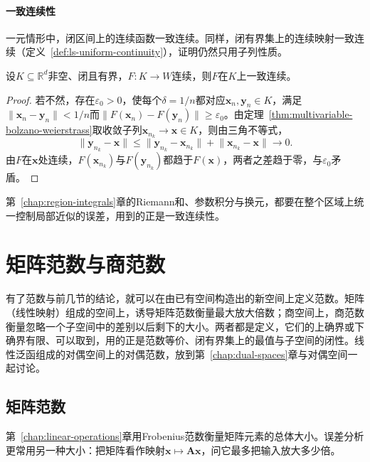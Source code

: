 \paragraph{一致连续性}
一元情形中，闭区间上的连续函数一致连续。同样，闭有界集上的连续映射一致连续（定义~\ref{def:ls-uniform-continuity}），证明仍然只用子列性质。
\begin{theorem}[闭有界集上的一致连续性]
\label{thm:multivariable-uniform-continuity}
设$K\subseteq\mathbb R^d$非空、闭且有界，$F:K\to W$连续，则$F$在$K$上一致连续。
\end{theorem}
\begin{proof}
若不然，存在$\varepsilon_0>0$，使每个$\delta=1/n$都对应$\bm x_n,\bm y_n\in K$，满足$\lVert\bm x_n-\bm y_n\rVert<1/n$而$\lVert F(\bm x_n)-F(\bm y_n)\rVert\geq\varepsilon_0$。由定理~\ref{thm:multivariable-bolzano-weierstrass}取收敛子列$\bm x_{n_k}\to\bm x\in K$，则由三角不等式，
\[
 \lVert\bm y_{n_k}-\bm x\rVert\leq\lVert\bm y_{n_k}-\bm x_{n_k}\rVert+\lVert\bm x_{n_k}-\bm x\rVert\longrightarrow0.
\]
由$F$在$\bm x$处连续，$F(\bm x_{n_k})$与$F(\bm y_{n_k})$都趋于$F(\bm x)$，两者之差趋于零，与$\varepsilon_0$矛盾。
\end{proof}
第~\ref{chap:region-integrals}章的Riemann和、参数积分与换元，都要在整个区域上统一控制局部近似的误差，用到的正是一致连续性。

\section{矩阵范数与商范数}
\label{sec:ls-derived-norms}

有了范数与前几节的结论，就可以在由已有空间构造出的新空间上定义范数。矩阵（线性映射）组成的空间上，诱导矩阵范数衡量最大放大倍数；商空间上，商范数衡量忽略一个子空间中的差别以后剩下的大小。两者都是定义，它们的上确界或下确界有限、可以取到，用的正是范数等价、闭有界集上的最值与子空间的闭性。线性泛函组成的对偶空间上的对偶范数，放到第~\ref{chap:dual-spaces}章与对偶空间一起讨论。

\subsection{矩阵范数}
\label{sec:ls-matrix-norms}
\label{sec:ch06-map-comparison}
\label{sec:matrix-analysis-norms-effective-rank}
\label{sec:multivariable-operator-norm}

第~\ref{chap:linear-operations}章用Frobenius范数衡量矩阵元素的总体大小。误差分析更常用另一种大小：把矩阵看作映射$\bm x\mapsto\bm A\bm x$，问它最多把输入放大多少倍。


